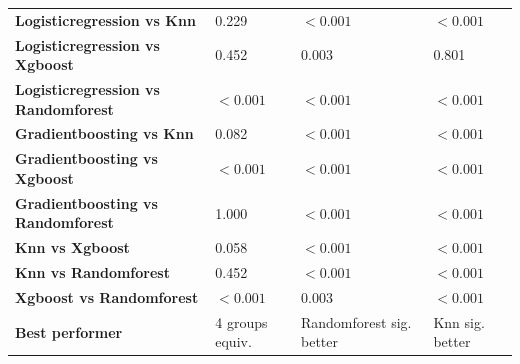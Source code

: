 \begin{table}[H]
{\begin{tabular}{llll}
        \textbf{Logisticregression vs Knn} & 0.229 & $< 0.001$ & $< 0.001$ \\
        \textbf{Logisticregression vs Xgboost} & 0.452 & 0.003 & 0.801 \\
        \textbf{Logisticregression vs Randomforest} & $< 0.001$ & $< 0.001$ & $< 0.001$ \\
        \textbf{Gradientboosting vs Knn} & 0.082 & $< 0.001$ & $< 0.001$ \\
        \textbf{Gradientboosting vs Xgboost} & $< 0.001$ & $< 0.001$ & $< 0.001$ \\
        \textbf{Gradientboosting vs Randomforest} & 1.000 & $< 0.001$ & $< 0.001$ \\
        \textbf{Knn vs Xgboost} & 0.058 & $< 0.001$ & $< 0.001$ \\
        \textbf{Knn vs Randomforest} & 0.452 & $< 0.001$ & $< 0.001$ \\
        \textbf{Xgboost vs Randomforest} & $< 0.001$ & 0.003 & $< 0.001$ \\
        \textbf{Best performer} & 4 groups equiv. & Randomforest sig. better & Knn sig. better \\
        \bottomrule
    \end{tabular}}
\end{table}